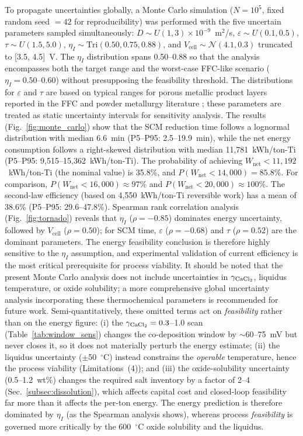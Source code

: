 \documentclass[sn-mathphys,Numbered]{sn-jnl}
\begin{document}
To propagate uncertainties globally, a Monte Carlo simulation ($N = 10^5$, fixed random seed $= 42$ for reproducibility) was performed with the five uncertain parameters sampled simultaneously: $D \sim U(1, 3) \times 10^{-9}$~m$^2$/s, $\varepsilon \sim U(0.1, 0.5)$, $\tau \sim U(1.5, 5.0)$, $\eta_I \sim \mathrm{Tri}(0.50, 0.75, 0.88)$, and $V_{\mathrm{cell}} \sim \mathcal{N}(4.1, 0.3)$ truncated to [3.5, 4.5]~V. The $\eta_I$ distribution spans 0.50--0.88 so that the analysis encompasses both the target range and the worst-case FFC-like scenario ($\eta_I = 0.50$--0.60) without presupposing the feasibility threshold. The distributions for $\varepsilon$ and $\tau$ are based on typical ranges for porous metallic product layers reported in the FFC and powder metallurgy literature \cite{fray2000}; these parameters are treated as static uncertainty intervals for sensitivity analysis. The results (Fig.~\ref{fig:monte_carlo}) show that the SCM reduction time follows a lognormal distribution with median 6.6~min (P5--P95: 2.5--19.9~min), while the net energy consumption follows a right-skewed distribution with median 11{,}781~kWh/ton-Ti (P5--P95: 9{,}515--15{,}362~kWh/ton-Ti). The probability of achieving $W_{\mathrm{net}} < 11{,}192$~kWh/ton-Ti (the nominal value) is 35.8\%, and $P(W_{\mathrm{net}} < 14{,}000) = 85.8\%$. For comparison, $P(W_{\mathrm{net}} < 16{,}000) \approx 97\%$ and $P(W_{\mathrm{net}} < 20{,}000) \approx 100\%$. The second-law efficiency (based on 4{,}550~kWh/ton-Ti reversible work) has a mean of 38.6\% (P5--P95: 29.6--47.8\%). Spearman rank correlation analysis (Fig.~\ref{fig:tornado}) reveals that $\eta_I$ ($\rho = -0.85$) dominates energy uncertainty, followed by $V_{\mathrm{cell}}$ ($\rho = 0.50$); for SCM time, $\varepsilon$ ($\rho = -0.68$) and $\tau$ ($\rho = 0.52$) are the dominant parameters. The energy feasibility conclusion is therefore highly sensitive to the $\eta_I$ assumption, and experimental validation of current efficiency is the most critical prerequisite for process viability. It should be noted that the present Monte Carlo analysis does not include uncertainties in $\gamma_{\ce{CaCl2}}$, liquidus temperature, or oxide solubility; a more comprehensive global uncertainty analysis incorporating these thermochemical parameters is recommended for future work. Semi-quantitatively, these omitted terms act on \emph{feasibility} rather than on the energy figure: (i) the $\gamma_{\ce{CaCl2}} = 0.3$--1.0 scan (Table~\ref{tab:window_sens}) changes the co-deposition window by $\sim$60--75~mV but never closes it, so it does not materially perturb the energy estimate; (ii) the liquidus uncertainty ($\pm$50~$^{\circ}$C) instead constrains the \emph{operable} temperature, hence the process viability (Limitations~(4)); and (iii) the oxide-solubility uncertainty (0.5--1.2~wt\%) changes the required salt inventory by a factor of 2--4 (Sec.~\ref{subsec:dissolution}), which affects capital cost and closed-loop feasibility far more than it affects the per-ton energy. The energy prediction is therefore dominated by $\eta_I$ (as the Spearman analysis shows), whereas process \emph{feasibility} is governed more critically by the 600~$^{\circ}$C oxide solubility and the liquidus.
\end{document}
